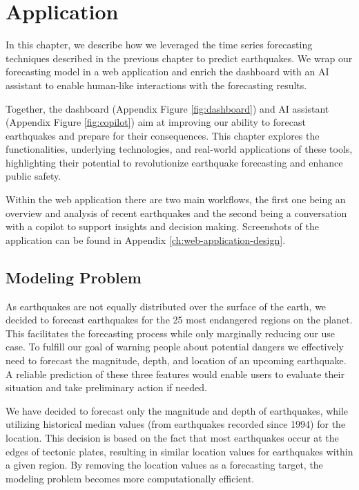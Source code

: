 \chapter{Application}
\label{ch:application}
In this chapter, we describe how we leveraged the time series forecasting techniques
described in the previous chapter to predict earthquakes. We wrap our forecasting
model in a web application and enrich the dashboard with an AI assistant
to enable human-like interactions with the forecasting results.

Together, the dashboard (Appendix Figure \ref{fig:dashboard}) and
AI assistant (Appendix Figure \ref{fig:copilot}) aim at improving our ability to forecast
earthquakes and prepare for their consequences. This chapter explores the functionalities,
underlying technologies, and real-world applications of these tools, highlighting their
potential to revolutionize earthquake forecasting and enhance public safety.

Within the web application there are two main workflows, the first one being an overview and
analysis of recent earthquakes and the second being a conversation with a copilot to
support insights and decision making. Screenshots of the application can be found in
Appendix \ref{ch:web-application-design}.

\section{Modeling Problem}

As earthquakes are not equally distributed over the surface of the earth,
we decided to forecast earthquakes for the 25 most endangered regions on
the planet. This facilitates the forecasting process while only marginally
reducing our use case. To fulfill our goal of warning people about potential
dangers we effectively need to forecast the magnitude, depth, and location of
an upcoming earthquake. A reliable prediction of these three features would
enable users to evaluate their situation and take preliminary action if needed.

We have decided to forecast only the magnitude and depth of earthquakes,
while utilizing historical median values (from earthquakes recorded since 1994)
for the location. This decision is based
on the fact that most earthquakes occur at the edges of tectonic plates,
resulting in similar location values for earthquakes within a given region.
By removing the location values as a forecasting target, the modeling problem
becomes more computationally efficient.

